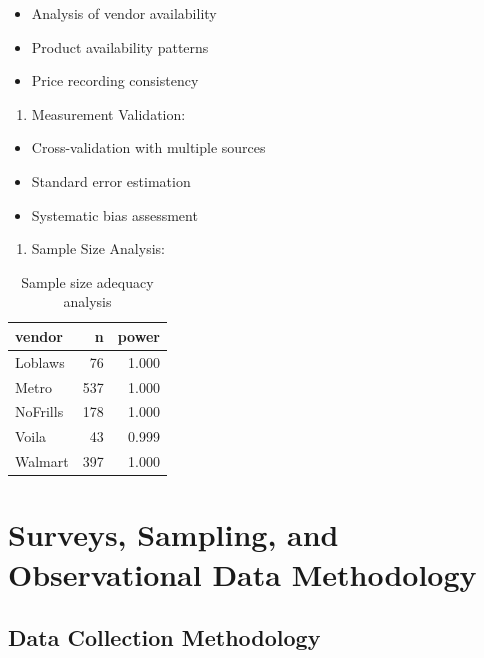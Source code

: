 \documentclass[
  letterpaper,
  DIV=11,
  numbers=noendperiod]{scrartcl}
\providecommand{\tightlist}{%
  \setlength{\itemsep}{0pt}\setlength{\parskip}{0pt}}\usepackage{longtable,booktabs,array}
\begin{document}
\begin{itemize}
\item
  Analysis of vendor availability
\item
  Product availability patterns
\item
  Price recording consistency
\end{itemize}

\begin{enumerate}
\def\labelenumi{\arabic{enumi}.}
\setcounter{enumi}{1}
\tightlist
\item
  Measurement Validation:
\end{enumerate}

\begin{itemize}
\item
  Cross-validation with multiple sources
\item
  Standard error estimation
\item
  Systematic bias assessment
\end{itemize}

\begin{enumerate}
\def\labelenumi{\arabic{enumi}.}
\setcounter{enumi}{2}
\tightlist
\item
  Sample Size Analysis:
\end{enumerate}

\begin{longtable}[t]{lrr}

\caption{\label{tbl-sample-size}Sample size adequacy analysis}

\tabularnewline

\toprule
vendor & n & power\\
\midrule
Loblaws & 76 & 1.000\\
Metro & 537 & 1.000\\
NoFrills & 178 & 1.000\\
Voila & 43 & 0.999\\
Walmart & 397 & 1.000\\
\bottomrule

\end{longtable}

\section{Surveys, Sampling, and Observational Data
Methodology}\label{surveys-sampling-and-observational-data-methodology}

\subsection{Data Collection
Methodology}\label{data-collection-methodology}
\end{document}
